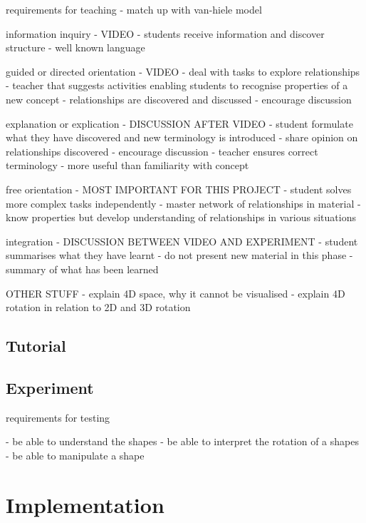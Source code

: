 \documentclass{l4proj}
\begin{document}
requirements for teaching
 - match up with van-hiele model

 information inquiry - VIDEO
 - students receive information and discover structure
 - well known language

guided or directed orientation - VIDEO
 - deal with tasks to explore relationships
 - teacher that suggests activities enabling students to recognise properties of a new concept
 - relationships are discovered and discussed
   - encourage discussion

explanation or explication - DISCUSSION AFTER VIDEO
 - student formulate what they have discovered and new terminology is introduced
 - share opinion on relationships discovered
   - encourage discussion
 - teacher ensures correct terminology - more useful than familiarity with concept

free orientation - MOST IMPORTANT FOR THIS PROJECT
 - student solves more complex tasks independently
 - master network of relationships in material
 - know properties but develop understanding of relationships in various situations

integration - DISCUSSION BETWEEN VIDEO AND EXPERIMENT
 - student summarises what they have learnt
 - do not present new material in this phase
 - summary of what has been learned

OTHER STUFF
 - explain 4D space, why it cannot be visualised
 - explain 4D rotation in relation to 2D and 3D rotation

\section{Tutorial}



\section{Experiment}
\label{experimental_design}


requirements for testing

 - be able to understand the shapes
 - be able to interpret the rotation of a shapes
 - be able to manipulate a shape

\chapter{Implementation}
\end{document}
